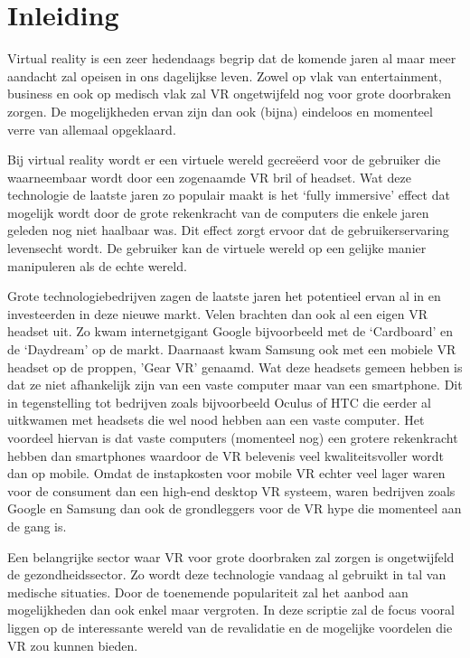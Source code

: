 
\chapter{Inleiding}
\label{ch:inleiding}

Virtual reality is een zeer hedendaags begrip dat de komende jaren al maar meer aandacht zal opeisen in ons dagelijkse leven. Zowel op vlak van entertainment, business en ook op medisch vlak zal VR ongetwijfeld nog voor grote doorbraken zorgen. De mogelijkheden ervan zijn dan ook (bijna) eindeloos en momenteel verre van allemaal opgeklaard.

Bij virtual reality wordt er een virtuele wereld gecreëerd voor de gebruiker die waarneembaar wordt door een zogenaamde VR bril of headset. Wat deze technologie de laatste jaren zo populair maakt is het ‘fully immersive’ effect dat mogelijk wordt door de grote rekenkracht van de computers die enkele jaren geleden nog niet haalbaar was. Dit effect zorgt ervoor dat de gebruikerservaring levensecht wordt. De gebruiker kan de virtuele wereld op een gelijke manier manipuleren als de echte wereld. 

Grote technologiebedrijven zagen de laatste jaren het potentieel ervan al in en investeerden in deze nieuwe markt. Velen brachten dan ook al een eigen VR headset uit. Zo kwam internetgigant Google bijvoorbeeld met de ‘Cardboard’ en de ‘Daydream’ op de markt. Daarnaast kwam Samsung ook met een mobiele VR headset op de proppen, 'Gear VR’ genaamd. Wat deze headsets gemeen hebben is dat ze niet afhankelijk zijn van een vaste computer maar van een smartphone. Dit in tegenstelling tot bedrijven zoals bijvoorbeeld Oculus of HTC die eerder al uitkwamen met headsets die wel nood hebben aan een vaste computer. Het voordeel hiervan is dat vaste computers (momenteel nog) een grotere rekenkracht hebben dan smartphones waardoor de VR belevenis veel kwaliteitsvoller wordt dan op mobile. Omdat de instapkosten voor mobile VR echter veel lager waren voor de consument dan een high-end desktop VR systeem, waren bedrijven zoals Google en Samsung dan ook de grondleggers voor de VR hype die momenteel aan de gang is.

Een belangrijke sector waar VR voor grote doorbraken zal zorgen is ongetwijfeld de gezondheidssector. Zo wordt deze technologie vandaag al gebruikt in tal van medische situaties. Door de toenemende populariteit zal het aanbod aan mogelijkheden dan ook enkel maar vergroten. In deze scriptie zal de focus vooral liggen op de interessante wereld van de revalidatie en de mogelijke voordelen die VR zou kunnen bieden.


